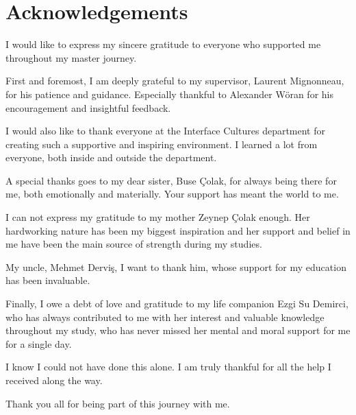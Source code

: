 \section*{Acknowledgements}
    I would like to express my sincere gratitude to everyone who supported me throughout my master journey.\par

    First and foremost, I am deeply grateful to my supervisor, Laurent Mignonneau, for his patience and guidance. Especially thankful to Alexander Wöran for his encouragement and insightful feedback.\par

    I would also like to thank everyone at the Interface Cultures department for creating such a supportive and inspiring environment. I learned a lot from everyone, both inside and outside the department.\par

    A special thanks goes to my dear sister, Buse Çolak, for always being there for me, both emotionally and materially. Your support has meant the world to me.\par

    I can not express my gratitude to my mother Zeynep Çolak enough. Her hardworking nature has been my biggest inspiration and her support and belief in me have been the main source of strength during my studies.\par

    My uncle, Mehmet Derviş, I want to thank him, whose support for my education has been invaluable.\par

    Finally, I owe a debt of love and gratitude to my life companion Ezgi Su Demirci, who has always contributed to me with her interest and valuable knowledge throughout my study, who has never missed her mental and moral support for me for a single day.\par

    I know I could not have done this alone. I am truly thankful for all the help I received along the way.\par

    Thank you all for being part of this journey with me.\par
